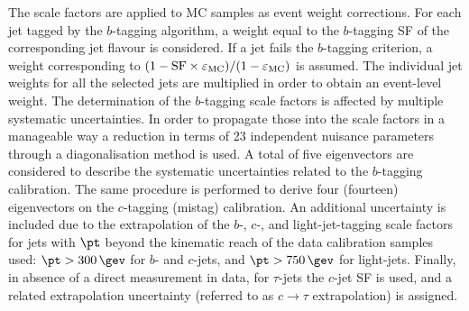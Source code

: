 The scale factors are applied to MC samples as event weight corrections. For each jet tagged by the $b$-tagging algorithm, a weight equal to the $b$-tagging SF of the corresponding jet flavour is considered. If a jet fails the $b$-tagging criterion, a weight corresponding to $(1-{\rm SF}\times\epsilon_{\rm MC})/(1-\epsilon_{\rm MC})$ is assumed. The individual jet weights for all the selected jets are multiplied in order to obtain an event-level weight. The determination of the $b$-tagging scale factors is affected by multiple systematic uncertainties. In order to propagate those into the scale factors in a manageable way a reduction in terms of 23 independent nuisance parameters through a diagonalisation method is used. A total of five eigenvectors are considered to describe the systematic uncertainties related to the $b$-tagging calibration. The same procedure is performed to derive four (fourteen) eigenvectors on the $c$-tagging (mistag) calibration. An additional uncertainty is included due to the extrapolation of the $b$-, $c$-, and light-jet-tagging scale factors for jets with $\pt$ beyond the kinematic reach of the data calibration samples used: $\pt>300 \,\gev$ for $b$- and $c$-jets, and $\pt>750\,\gev$ for light-jets. Finally, in absence of a direct measurement in data, for $\tau$-jets the $c$-jet SF is used, and a related extrapolation uncertainty (referred to as $c \to \tau$ extrapolation) is assigned.

